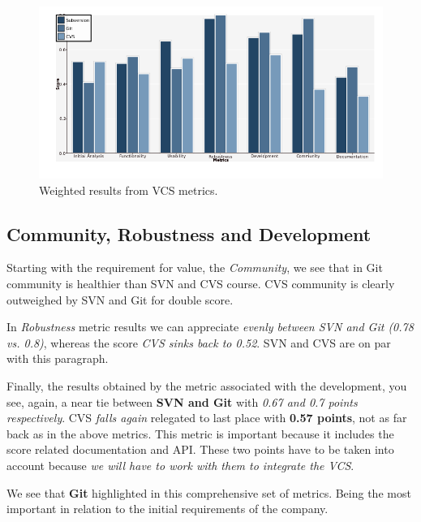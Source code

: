 \documentclass[11pt]{scrartcl}
\begin{document}
\begin{figure}[H]
\begin{center}
  \includegraphics[width=1\textwidth]{libcsvanaly2/generations/metrics-weight-vertical-chart.png}
  \caption{Weighted results from VCS metrics.}
  \label{fig:metric-weight-result}
\end{center}
\end{figure}

\subsection{Community, Robustness and Development}\label{sec:compare-com-rob-dev}

\par Starting with the requirement for value, the \emph{Community}, we see that in Git community is healthier than SVN and CVS course. CVS community is clearly outweighed by SVN and Git for double score.

\par In \emph{Robustness} metric results we ​​can appreciate \emph{evenly between SVN and Git (0.78 vs. 0.8)}, whereas the score \emph{CVS sinks back to 0.52}. SVN and CVS are on par with this paragraph.

\par Finally, the results obtained by the metric associated with the development, you see, again, a near tie between \textbf{SVN and Git} with \emph{0.67 and 0.7 points respectively}. CVS \emph{falls again} relegated to last place with \textbf{0.57 points}, not as far back as in the above metrics. This metric is important because it includes the score related documentation and API. These two points have to be taken into account because \emph{we will have to work with them to integrate the VCS}.

\par We see that \textbf{Git} highlighted in this comprehensive set of metrics. Being the most important in relation to the initial requirements of the company.
\end{document}
